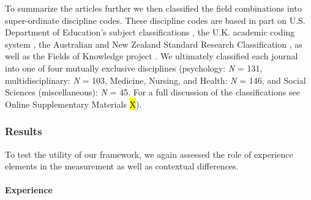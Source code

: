 To summarize the articles further we then classified the field
combinations into super-ordinate discipline codes. These discipline
codes are based in part on U.S. Department of Education's subject
classifications \citep[i.e., CIP;][]{InstituteofEducationSciences2020},
the U.K. academic coding system
\citep[JACS 3.0;][]{HigherEducationStatisticsAgency2013}, the Australian
and New Zealand Standard Research Classification
\citep[ANZSRC 2020;][]{AustralianBureauofStatistics2020}, as well as the
Fields of Knowledge project \citep{ThingsmadeThinkable2014}. We
ultimately classified each journal into one of four mutually exclusive
disciplines (psychology: \textit{N} = 131, multidisciplinary: \textit{N}
= 103, Medicine, Nursing, and Health: \textit{N} = 146, and Social
Sciences (miscellaneous): \textit{N} = 45. For a full discussion of the
classifications see Online Supplementary Materials \hl{X}).

\subsubsection{Results}

To test the utility of our framework, we again assessed the role of
experience elements in the measurement as well as contextual
differences.

\paragraph{Experience}

